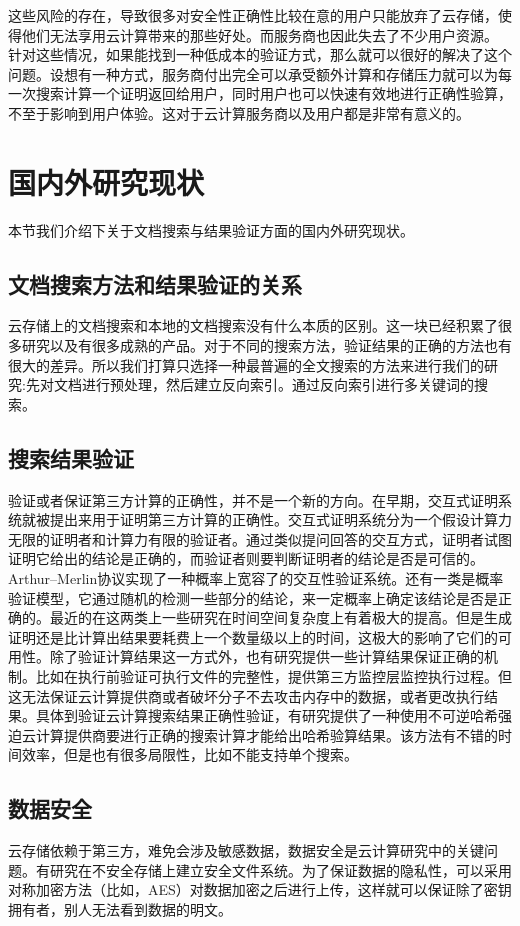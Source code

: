 这些风险的存在，导致很多对安全性正确性比较在意的用户只能放弃了云存储，使得他们无法享用云计算带来的那些好处。而服务商也因此失去了不少用户资源。
针对这些情况，如果能找到一种低成本的验证方式，那么就可以很好的解决了这个问题。设想有一种方式，服务商付出完全可以承受额外计算和存储压力就可以为每一次搜索计算一个证明返回给用户，同时用户也可以快速有效地进行正确性验算，不至于影响到用户体验。这对于云计算服务商以及用户都是非常有意义的。

\section{国内外研究现状}
本节我们介绍下关于文档搜索与结果验证方面的国内外研究现状。

\subsection{文档搜索方法和结果验证的关系}
		云存储上的文档搜索和本地的文档搜索没有什么本质的区别。这一块已经积累了很多研究以及有很多成熟的产品。对于不同的搜索方法，验证结果的正确的方法也有很大的差异。所以我们打算只选择一种最普遍的全文搜索的方法来进行我们的研究:先对文档进行预处理，然后建立反向索引。通过反向索引进行多关键词的搜索。
\subsection{搜索结果验证}
				 验证或者保证第三方计算的正确性，并不是一个新的方向。在早期，交互式证明系统就被提出来用于证明第三方计算的正确性。交互式证明系统分为一个假设计算力无限的证明者和计算力有限的验证者。通过类似提问回答的交互方式，证明者试图证明它给出的结论是正确的，而验证者则要判断证明者的结论是否是可信的。Arthur–Merlin协议实现了一种概率上宽容了的交互性验证系统。还有一类是概率验证模型，它通过随机的检测一些部分的结论，来一定概率上确定该结论是否是正确的。最近的在这两类上一些研究在时间空间复杂度上有着极大的提高。但是生成证明还是比计算出结果要耗费上一个数量级以上的时间，这极大的影响了它们的可用性。除了验证计算结果这一方式外，也有研究提供一些计算结果保证正确的机制。比如在执行前验证可执行文件的完整性，提供第三方监控层监控执行过程。但这无法保证云计算提供商或者破坏分子不去攻击内存中的数据，或者更改执行结果。具体到验证云计算搜索结果正确性验证，有研究提供了一种使用不可逆哈希强迫云计算提供商要进行正确的搜索计算才能给出哈希验算结果。该方法有不错的时间效率，但是也有很多局限性，比如不能支持单个搜索。
\subsection{数据安全}
						云存储依赖于第三方，难免会涉及敏感数据，数据安全是云计算研究中的关键问题。有研究在不安全存储上建立安全文件系统。为了保证数据的隐私性，可以采用对称加密方法（比如，AES）对数据加密之后进行上传，这样就可以保证除了密钥拥有者，别人无法看到数据的明文。

